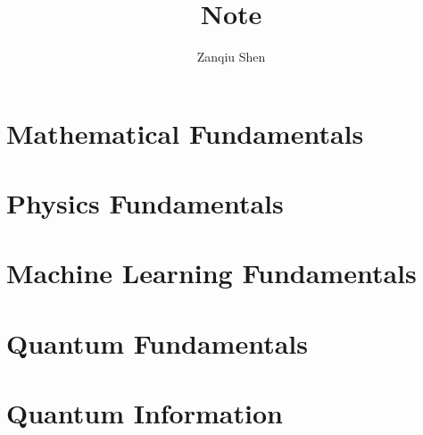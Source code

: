 \documentclass[a4paper,11pt,openany]{book}
\numberwithin{equation}{section}
\begin{document}
\title{\textbf{Note}}
\author{Zanqiu Shen}
\maketitle
%
\tableofcontents

\setcounter{chapter}{0}
\part{Mathematical Fundamentals}





\part{Physics Fundamentals}


\part{Machine Learning Fundamentals}


\part{Quantum Fundamentals}






\part{Quantum Information}




\newpage
%
%
\end{document}
